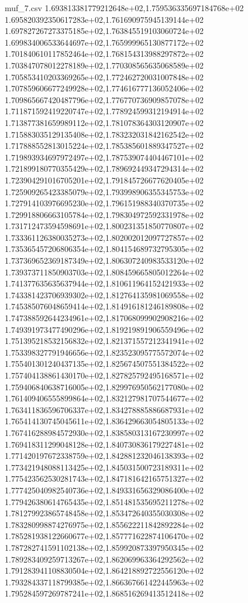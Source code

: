 \begin{filecontents*}{muf_7.csv}
1.693813381779212648e+02,1.759536335697184768e+02
1.695820392350617283e+02,1.761690975945139144e+02
1.697827267273375185e+02,1.763845519103060724e+02
1.699834006533644697e+02,1.765999965130877172e+02
1.701840610117852464e+02,1.768154313988297872e+02
1.703847078012278189e+02,1.770308565635068589e+02
1.705853410203369265e+02,1.772462720031007848e+02
1.707859606677249928e+02,1.774616777136052406e+02
1.709865667420487796e+02,1.776770736909857078e+02
1.711871592419220747e+02,1.778924599312194914e+02
1.713877381659989112e+02,1.781078364303120907e+02
1.715883035129135408e+02,1.783232031842162542e+02
1.717888552813015224e+02,1.785385601889347527e+02
1.719893934697972497e+02,1.787539074404467101e+02
1.721899180770355429e+02,1.789692449347294314e+02
1.723904291016705201e+02,1.791845726677620405e+02
1.725909265423385079e+02,1.793998906355345753e+02
1.727914103976695230e+02,1.796151988340370735e+02
1.729918806663105784e+02,1.798304972592331978e+02
1.731712473594598691e+02,1.800231351850770807e+02
1.733361126380035273e+02,1.802002012097727857e+02
1.735365457206806354e+02,1.804154689732795305e+02
1.737369652369187349e+02,1.806307240983533120e+02
1.739373711850903703e+02,1.808459665805012264e+02
1.741377635635637944e+02,1.810611964152421933e+02
1.743381423706939302e+02,1.812764135981069558e+02
1.745385076048659414e+02,1.814916181246189808e+02
1.747388592644234961e+02,1.817068099902908216e+02
1.749391973477490296e+02,1.819219891906559496e+02
1.751395218532156832e+02,1.821371557212341941e+02
1.753398327791946656e+02,1.823523095775572074e+02
1.755401301240437135e+02,1.825674507551384522e+02
1.757404138861430170e+02,1.827825792495168571e+02
1.759406840638716005e+02,1.829976950562177080e+02
1.761409406555899864e+02,1.832127981707544677e+02
1.763411836596706337e+02,1.834278885886687931e+02
1.765414130745045611e+02,1.836429663054805133e+02
1.767416288984572930e+02,1.838580313167230997e+02
1.769418311299048128e+02,1.840730836179227481e+02
1.771420197672338759e+02,1.842881232046138393e+02
1.773421948088113425e+02,1.845031500723189311e+02
1.775423562530281743e+02,1.847181642165751327e+02
1.777425040982540736e+02,1.849331656329086400e+02
1.779426380614765435e+02,1.851481535695211278e+02
1.781279923865748458e+02,1.853472640355030308e+02
1.783280998874276975e+02,1.855622211842892284e+02
1.785281938122660677e+02,1.857771622874106470e+02
1.787282741591102138e+02,1.859920873397950345e+02
1.789283409259713267e+02,1.862069963364292562e+02
1.791283941108830504e+02,1.864218892722556120e+02
1.793284337118799385e+02,1.866367661422445963e+02
1.795284597269787241e+02,1.868516269413512418e+02

\end{filecontents*}
